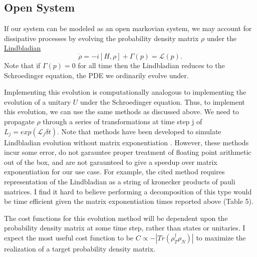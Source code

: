 \documentclass[letterpaper, 12pt]{article}
\begin{document}
\subsection{Open System}
If our system can be modeled as an open markovian system, we may account for dissipative processes by evolving the probability density matrix $\rho$ under the \href{https://en.wikipedia.org/wiki/Lindbladian}{Lindbladian}
\[
\dot{\rho} = -i[H, \rho] + \Gamma(p) = \mathcal{L}(p)\textrm{.}
\]
Note that if $\Gamma(p) = 0$ for all time then the Lindbladian reduces to the Schroedinger equation, the PDE we ordinarily evolve under.

Implementing this evolution is computationally analogous to implementing the evolution of a unitary $U$ under the Schroedinger equation. Thus, to implement this evolution, we can use the same methods as discussed above. We need to propagate $\rho$ through a series of transformations at time step j of $L_{j} = exp(\mathcal{L}_{j}\delta t)$. Note that methods have been developed to simulate Lindbladian evolution without matrix exponentiation \cite{cleve2016efficient}. However, these methods incur some error, do not garauntee proper treatment of floating point arithmetic out of the box, and are not garaunteed to give a speedup over matrix exponentiation for our use case. For example, the cited method requires representation of the Lindbladian as a string of kronecker products of pauli matrices. I find it hard to believe performing a decomposition of this type would be time efficient given the matrix exponentiation times reported above (Table 5).

The cost functions for this evolution method will be dependent upon the probability density matrix at some time step, rather than states or unitaries. I expect the most useful cost function to be $C \propto -|Tr(\rho^{\dagger}_{T} \rho_{N})|$ to maximize the realization of a target probability density matrix.
\end{document}
